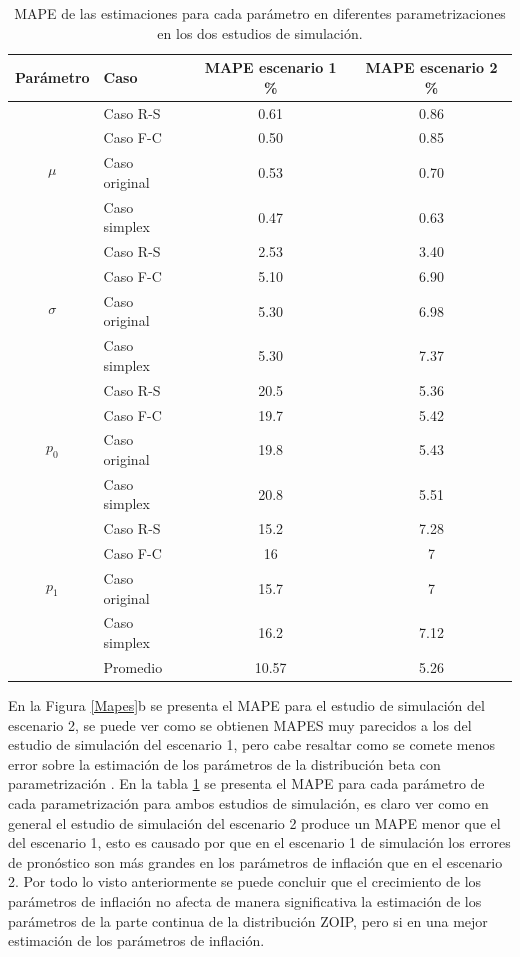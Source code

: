 \begin{table}[!hbt]
{\scriptsize
\begin{center}
\begin{tabular}{|c|l|cc|}\hline
 Par\'{a}metro & Caso & MAPE escenario 1 \% &  MAPE escenario 2 \% \\ \hline

\multirow{4}{*}{$\mu$}&Caso R-S &0.61 & 0.86	\\
& Caso F-C & 0.50	& 0.85	\\
& Caso original &0.53 & 0.70	 \\
& Caso simplex 	&0.47 & 0.63	\\ \hline

\multirow{4}{*}{$\sigma$} &Caso R-S &2.53 & 3.40\\
& Caso F-C 	&5.10 & 6.90\\
& Caso original &5.30 & 6.98\\
& Caso simplex 	&5.30  &7.37 \\\hline

\multirow{4}{*}{$p_0$} &Caso R-S &20.5  & 5.36	\\
& Caso F-C &19.7  & 5.42	\\
& Caso original &19.8 & 5.43	\\
& Caso simplex 	&20.8 & 5.51\\ \hline

\multirow{4}{*}{$p_1$} &Caso R-S 	&15.2 & 7.28\\
& Caso F-C &16 & 7  \\
& Caso original &15.7	 & 7	\\
& Caso simplex &16.2 & 7.12	 \\ \hline
& Promedio & 10.57 & 5.26 \\ \hline
\end{tabular}
\caption{MAPE de las estimaciones para cada par\'{a}metro en diferentes parametrizaciones en los dos estudios de simulaci\'{o}n.}
\label{T_MAPES}
\end{center}
}
\end{table}

En la Figura \ref{Mapes}b se presenta el MAPE para el estudio de simulaci\'{o}n del escenario 2, se puede ver como se obtienen MAPES muy parecidos a los del estudio de simulaci\'{o}n del escenario 1, pero cabe resaltar como se comete menos error sobre la estimaci\'{o}n de los par\'{a}metros de la distribuci\'{o}n beta con parametrizaci\'{o}n \cite{Stasinopoulos2}. En la tabla \ref{T_MAPES} se presenta el MAPE para cada par\'{a}metro de cada parametrizaci\'{o}n para ambos estudios de simulaci\'{o}n, es claro ver como en general el estudio de simulaci\'{o}n del escenario 2 produce un MAPE menor que el del escenario 1, esto es causado por que en el escenario 1 de simulaci\'{o}n los errores de pron\'{o}stico son m\'{a}s grandes en los par\'{a}metros de inflaci\'{o}n que en el escenario 2. Por todo lo visto anteriormente se puede concluir que el crecimiento de los par\'{a}metros de inflaci\'{o}n no afecta de manera significativa la estimaci\'{o}n de los par\'{a}metros de la parte continua de la distribuci\'{o}n ZOIP, pero si en una mejor estimaci\'{o}n de los par\'{a}metros de inflaci\'{o}n.



